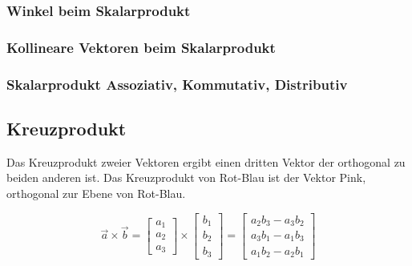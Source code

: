 \subsubsection{Winkel beim Skalarprodukt}

\subsubsection{Kollineare Vektoren beim Skalarprodukt}

\subsubsection{Skalarprodukt Assoziativ, Kommutativ, Distributiv}

\clearpage

\subsection{Kreuzprodukt}

Das Kreuzprodukt zweier Vektoren ergibt einen dritten Vektor der orthogonal
zu beiden anderen ist. Das Kreuzprodukt von Rot-Blau ist der Vektor Pink, orthogonal zur
Ebene von Rot-Blau.

\begin{equation*}
    \vec{a} \times \vec{b} =
    \begin{bmatrix}
        a_1 \\
        a_2 \\
        a_3
    \end{bmatrix} \times
    \begin{bmatrix}
        b_1 \\
        b_2 \\
        b_3
    \end{bmatrix} =
    \begin{bmatrix}
        a_2 b_3 - a_3 b_2 \\
        a_3 b_1 - a_1 b_3 \\
        a_1 b_2 - a_2 b_1
    \end{bmatrix}
\end{equation*}

